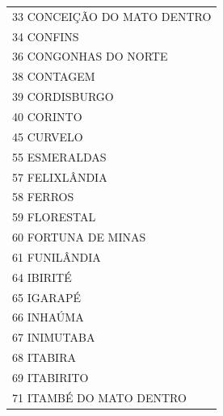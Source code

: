 \documentclass{article}
\begin{document}
\begin{longtable}[c]{m{18cm}}
\multicolumn{1}{l}{ \hspace{2em} 33 CONCEIÇÃO DO MATO DENTRO } \\
\multicolumn{1}{l}{ \hspace{2em} 34 CONFINS } \\
\multicolumn{1}{l}{ \hspace{2em} 36 CONGONHAS DO NORTE } \\
\multicolumn{1}{l}{ \hspace{2em} 38 CONTAGEM } \\
\multicolumn{1}{l}{ \hspace{2em} 39 CORDISBURGO } \\
\multicolumn{1}{l}{ \hspace{2em} 40 CORINTO } \\
\multicolumn{1}{l}{ \hspace{2em} 45 CURVELO } \\
\multicolumn{1}{l}{ \hspace{2em} 55 ESMERALDAS } \\
\multicolumn{1}{l}{ \hspace{2em} 57 FELIXLÂNDIA } \\
\multicolumn{1}{l}{ \hspace{2em} 58 FERROS } \\
\multicolumn{1}{l}{ \hspace{2em} 59 FLORESTAL } \\
\multicolumn{1}{l}{ \hspace{2em} 60 FORTUNA DE MINAS } \\
\multicolumn{1}{l}{ \hspace{2em} 61 FUNILÂNDIA } \\
\multicolumn{1}{l}{ \hspace{2em} 64 IBIRITÉ } \\
\multicolumn{1}{l}{ \hspace{2em} 65 IGARAPÉ } \\
\multicolumn{1}{l}{ \hspace{2em} 66 INHAÚMA } \\
\multicolumn{1}{l}{ \hspace{2em} 67 INIMUTABA } \\
\multicolumn{1}{l}{ \hspace{2em} 68 ITABIRA } \\
\multicolumn{1}{l}{ \hspace{2em} 69 ITABIRITO } \\
\multicolumn{1}{l}{ \hspace{2em} 71 ITAMBÉ DO MATO DENTRO } \\

\end{longtable}
\end{document}
